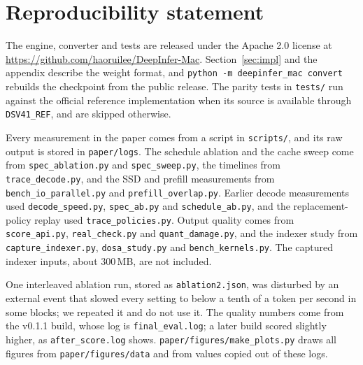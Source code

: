 \section*{Reproducibility statement}
The engine, converter and tests are released under the Apache 2.0 license at \url{https://github.com/haoruilee/DeepInfer-Mac}. Section~\ref{sec:impl} and the appendix describe the weight format, and \texttt{python -m deepinfer\_mac convert} rebuilds the checkpoint from the public release. The parity tests in \texttt{tests/} run against the official reference implementation when its source is available through \texttt{DSV41\_REF}, and are skipped otherwise.

Every measurement in the paper comes from a script in \texttt{scripts/}, and its raw output is stored in \texttt{paper/logs}. The schedule ablation and the cache sweep come from \texttt{spec\_ablation.py} and \texttt{spec\_sweep.py}, the timelines from \texttt{trace\_decode.py}, and the SSD and prefill measurements from \texttt{bench\_io\_parallel.py} and \texttt{prefill\_overlap.py}. Earlier decode measurements used \texttt{decode\_speed.py}, \texttt{spec\_ab.py} and \texttt{schedule\_ab.py}, and the replacement-policy replay used \texttt{trace\_policies.py}. Output quality comes from \texttt{score\_api.py}, \texttt{real\_check.py} and \texttt{quant\_damage.py}, and the indexer study from \texttt{capture\_indexer.py}, \texttt{dosa\_study.py} and \texttt{bench\_kernels.py}. The captured indexer inputs, about 300\,MB, are not included.

One interleaved ablation run, stored as \texttt{ablation2.json}, was disturbed by an external event that slowed every setting to below a tenth of a token per second in some blocks; we repeated it and do not use it. The quality numbers come from the v0.1.1 build, whose log is \texttt{final\_eval.log}; a later build scored slightly higher, as \texttt{after\_score.log} shows. \texttt{paper/figures/make\_plots.py} draws all figures from \texttt{paper/figures/data} and from values copied out of these logs.
